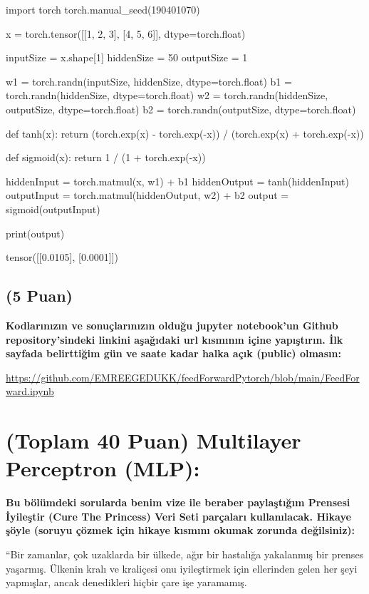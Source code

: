 \documentclass[11pt]{article}
\begin{document}
\begin{python}
import torch
torch.manual_seed(190401070)

x = torch.tensor([[1, 2, 3], [4, 5, 6]], dtype=torch.float)

inputSize = x.shape[1]
hiddenSize = 50
outputSize = 1

w1 = torch.randn(inputSize, hiddenSize, dtype=torch.float)
b1 = torch.randn(hiddenSize, dtype=torch.float)
w2 = torch.randn(hiddenSize, outputSize, dtype=torch.float)
b2 = torch.randn(outputSize, dtype=torch.float)

def tanh(x):
    return (torch.exp(x) - torch.exp(-x)) / (torch.exp(x) + torch.exp(-x))

def sigmoid(x):
    return 1 / (1 + torch.exp(-x))

hiddenInput = torch.matmul(x, w1) + b1
hiddenOutput = tanh(hiddenInput)
outputInput = torch.matmul(hiddenOutput, w2) + b2
output = sigmoid(outputInput)

print(output)
\end{python}

tensor([[0.0105],
        [0.0001]])

\subsection{(5 Puan)} \textbf{Kodlarınızın ve sonuçlarınızın olduğu jupyter notebook'un Github repository'sindeki linkini aşağıdaki url kısmının içine yapıştırın. İlk sayfada belirttiğim gün ve saate kadar halka açık (public) olmasın:}

\url{https://github.com/EMREEGEDUKK/feedForwardPytorch/blob/main/FeedForward.ipynb}

\section{(Toplam 40 Puan) Multilayer Perceptron (MLP):} 
\textbf{Bu bölümdeki sorularda benim vize ile beraber paylaştığım Prensesi İyileştir (Cure The Princess) Veri Seti parçaları kullanılacak. Hikaye şöyle (soruyu çözmek için hikaye kısmını okumak zorunda değilsiniz):} 

``Bir zamanlar, çok uzaklarda bir ülkede, ağır bir hastalığa yakalanmış bir prenses yaşarmış. Ülkenin kralı ve kraliçesi onu iyileştirmek için ellerinden gelen her şeyi yapmışlar, ancak denedikleri hiçbir çare işe yaramamış.
\end{document}
